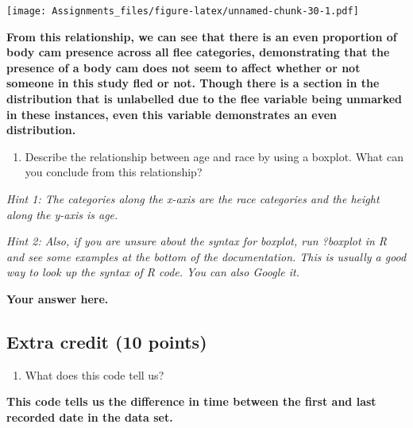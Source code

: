 \documentclass[
]{article}
\newenvironment{Shaded}{\begin{snugshade}}{\end{snugshade}}
\newcommand{\DecValTok}[1]{\textcolor[rgb]{0.00,0.00,0.81}{#1}}
\newcommand{\FunctionTok}[1]{\textcolor[rgb]{0.00,0.00,0.00}{#1}}
\newcommand{\NormalTok}[1]{#1}
\newcommand{\OtherTok}[1]{\textcolor[rgb]{0.56,0.35,0.01}{#1}}
\newcommand{\SpecialCharTok}[1]{\textcolor[rgb]{0.00,0.00,0.00}{#1}}
\providecommand{\tightlist}{%
  \setlength{\itemsep}{0pt}\setlength{\parskip}{0pt}}
\begin{document}
\texttt{[image: Assignments\_files/figure-latex/unnamed-chunk-30-1.pdf]}

\textbf{From this relationship, we can see that there is an even
proportion of body cam presence across all flee categories,
demonstrating that the presence of a body cam does not seem to affect
whether or not someone in this study fled or not. Though there is a
section in the distribution that is unlabelled due to the flee variable
being unmarked in these instances, even this variable demonstrates an
even distribution.}

\begin{enumerate}
\def\labelenumi{\alph{enumi}.}
\setcounter{enumi}{1}
\tightlist
\item
  Describe the relationship between age and race by using a boxplot.
  What can you conclude from this relationship?
\end{enumerate}

\emph{Hint 1: The categories along the x-axis are the race categories
and the height along the y-axis is age.}

\emph{Hint 2: Also, if you are unsure about the syntax for boxplot, run
?boxplot in R and see some examples at the bottom of the documentation.
This is usually a good way to look up the syntax of R code. You can also
Google it.}

\textbf{Your answer here.}

\hypertarget{extra-credit-10-points}{%
\subsection{Extra credit (10 points)}\label{extra-credit-10-points}}

\begin{enumerate}
\def\labelenumi{\alph{enumi}.}
\tightlist
\item
  What does this code tell us?
\end{enumerate}

\begin{Shaded}
\end{Shaded}

\textbf{This code tells us the difference in time between the first and
last recorded date in the data set.}
\end{document}
